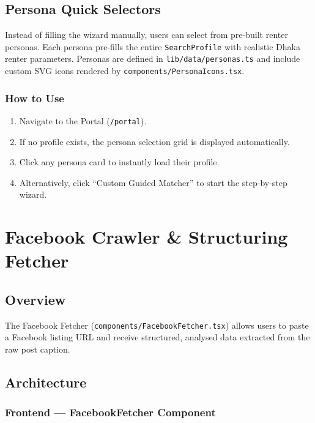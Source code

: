 \documentclass[12pt, a4paper, oneside]{report}
\newcommand{\filepath}[1]{\texttt{\small\color{codeblue}#1}}
\newcommand{\typename}[1]{\texttt{\small\color{codeblue}#1}}
\begin{document}
\section{Persona Quick Selectors}

Instead of filling the wizard manually, users can select from pre-built renter personas. Each persona pre-fills the entire \typename{SearchProfile} with realistic Dhaka renter parameters. Personas are defined in \filepath{lib/data/personas.ts} and include custom SVG icons rendered by \filepath{components/PersonaIcons.tsx}.

\subsection{How to Use}

\begin{enumerate}[leftmargin=2em]
  \item Navigate to the Portal (\texttt{/portal}).
  \item If no profile exists, the persona selection grid is displayed automatically.
  \item Click any persona card to instantly load their profile.
  \item Alternatively, click ``Custom Guided Matcher'' to start the step-by-step wizard.
\end{enumerate}


\chapter{Facebook Crawler \& Structuring Fetcher}

\section{Overview}

The Facebook Fetcher (\filepath{components/FacebookFetcher.tsx}) allows users to paste a Facebook listing URL and receive structured, analysed data extracted from the raw post caption.

\section{Architecture}

\subsection{Frontend --- FacebookFetcher Component}
\end{document}
